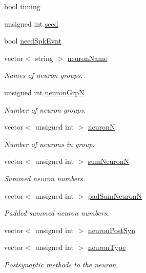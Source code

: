 \begin{DoxyCompactItemize}
bool \hyperlink{classNNmodel_afae2a91984509205ff07afc948cbf106}{timing}
\item 
unsigned int \hyperlink{classNNmodel_ad82f4dbcf4cc6a942965f9ecaa79616a}{seed}
\item 
bool \hyperlink{classNNmodel_a17091f9688dbfa4e9f2d83181a1b554a}{need\+Spk\+Evnt}
\item 
vector$<$ string $>$ \hyperlink{classNNmodel_af3c7ec6917040e62be5cee3505c330a8}{neuron\+Name}
\begin{DoxyCompactList}\small\item\em Names of neuron groups. \end{DoxyCompactList}\item 
unsigned int \hyperlink{classNNmodel_a383562e3f02192f58a6150a4ca0861c5}{neuron\+Grp\+N}
\begin{DoxyCompactList}\small\item\em Number of neuron groups. \end{DoxyCompactList}\item 
vector$<$ unsigned int $>$ \hyperlink{classNNmodel_a87d3de14d0d5c7183199fea48c04b949}{neuron\+N}
\begin{DoxyCompactList}\small\item\em Number of neurons in group. \end{DoxyCompactList}\item 
vector$<$ unsigned int $>$ \hyperlink{classNNmodel_a84cf2761cf76d70a06f871a77e64c0b4}{sum\+Neuron\+N}
\begin{DoxyCompactList}\small\item\em Summed neuron numbers. \end{DoxyCompactList}\item 
vector$<$ unsigned int $>$ \hyperlink{classNNmodel_a08d284601fc39e164ca5aeac399d6a59}{pad\+Sum\+Neuron\+N}
\begin{DoxyCompactList}\small\item\em Padded summed neuron numbers. \end{DoxyCompactList}\item 
vector$<$ unsigned int $>$ \hyperlink{classNNmodel_aec217846b4a0eeb38bfec1209319dd81}{neuron\+Post\+Syn}
\item 
vector$<$ unsigned int $>$ \hyperlink{classNNmodel_a0e5087ec30e3efb114f8f713759a4abc}{neuron\+Type}
\begin{DoxyCompactList}\small\item\em Postsynaptic methods to the neuron. \end{DoxyCompactList}\item 

\end{DoxyCompactItemize}
